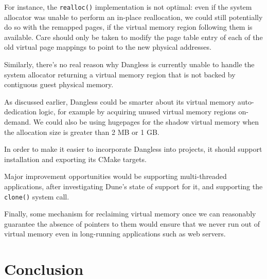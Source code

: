 For instance, the \lstinline!realloc()! implementation is not optimal: even if the system allocator was unable to perform an in-place reallocation, we could still potentially do so with the remapped pages, if the virtual memory region following them is available. Care should only be taken to modify the page table entry of each of the old virtual page mappings to point to the new physical addresses.

Similarly, there's no real reason why Dangless is currently unable to handle the system allocator returning a virtual memory region that is not backed by contiguous guest physical memory.

As discussed earlier, Dangless could be smarter about its virtual memory auto-dedication logic, for example by acquiring unused virtual memory regions on-demand. We could also be using hugepages for the shadow virtual memory when the allocation size is greater than 2 MB or 1 GB.

In order to make it easier to incorporate Dangless into projects, it should support installation and exporting its CMake targets.

Major improvement opportunities would be supporting multi-threaded applications, after investigating Dune's state of support for it, and supporting the \lstinline!clone()! system call.

Finally, some mechanism for reclaiming virtual memory once we can reasonably guarantee the absence of pointers to them would ensure that we never run out of virtual memory even in long-running applications such as web servers.

\section{Conclusion}

